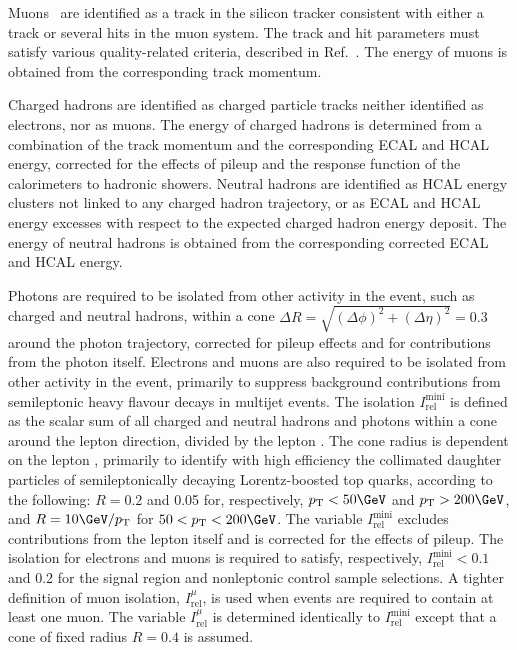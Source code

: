 Muons~\cite{Chatrchyan:2012xi} are identified as a track in the
silicon tracker consistent with either a track or several hits in the
muon system. The track and hit parameters must satisfy various
quality-related criteria, described in Ref.~\cite{Chatrchyan:2012xi}. 
The energy of muons is obtained from the corresponding track momentum.

Charged hadrons are identified as charged particle tracks neither
identified as electrons, nor as muons. The energy of charged hadrons
is determined from a combination of the track momentum and the
corresponding ECAL and HCAL energy, corrected for the effects of
pileup and the response function of the calorimeters to hadronic
showers. Neutral hadrons are identified as HCAL energy clusters not
linked to any charged hadron trajectory, or as ECAL and HCAL energy
excesses with respect to the expected charged hadron energy deposit.
The energy of neutral hadrons is obtained from the corresponding
corrected ECAL and HCAL energy.


Photons are required to be isolated from other activity in the event,
such as charged and neutral hadrons, within a cone $\Delta R =
\sqrt{(\Delta\phi)^2 + (\Delta\eta)^2} = 0.3$ around the photon
trajectory, corrected for pileup effects and for contributions from
the photon itself. Electrons and muons are also required to be
isolated from other activity in the event, primarily to suppress
background contributions from semileptonic heavy flavour decays in
multijet events. The isolation $I^\text{mini}_\text{rel}$ is defined
as the scalar \Pt sum of all charged and neutral hadrons and photons
within a cone around the lepton direction, divided by the lepton
\Pt. The cone radius is dependent on the lepton \Pt, primarily to
identify with high efficiency the collimated daughter particles of
semileptonically decaying Lorentz-boosted top quarks, according to the
following: $R = 0.2$ and 0.05 for, respectively, $\Pt < 50\GeV$ and
$\Pt > 200\GeV$, and $R = 10\GeV / \Pt$ for $50 < \Pt < 200\GeV$. The
variable $I^\text{mini}_\text{rel}$ excludes contributions from the
lepton itself and is corrected for the effects of pileup. The
isolation for electrons and muons is required to satisfy,
respectively, $I^\text{mini}_\text{rel} < 0.1$ and 0.2 for the signal
region and nonleptonic control sample selections.  A tighter
definition of muon isolation, $I^{\mu}_\text{rel}$, is used when
events are required to contain at least one muon. The variable
$I^{\mu}_\text{rel}$ is determined identically to
$I^\text{mini}_\text{rel}$ except that a cone of fixed radius $R =
0.4$ is assumed.


